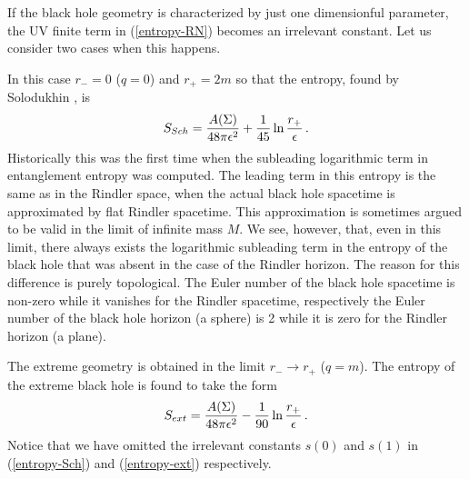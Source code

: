 \documentclass[12pt]{article}
\def\be{\begin{eqnarray}}
\def\ee{\end{eqnarray}}
\def\lb{\label}
\def\o{\over}
\begin{document}
\medskip
If the black hole geometry is characterized by just one dimensionful parameter, the UV finite term in (\ref{entropy-RN}) becomes an irrelevant constant.
Let us consider two cases when this happens.  
\medskip

 In this case $r_-=0$ ($q=0$) and $r_+=2m $ so that the entropy, found by Solodukhin  \cite{Solodukhin:1994yz}, is
\be
S_{Sch}={A(\Sigma)\o 48\pi\epsilon^2}+{1\o 45}\ln {r_+\o \epsilon}\, .
\lb{entropy-Sch}
\ee
Historically this was the first time when the subleading logarithmic term in entanglement  entropy was computed. The leading term in this entropy is the same as in the Rindler space, when the actual black hole spacetime is approximated by flat Rindler spacetime. This approximation is sometimes argued to be valid in the limit of infinite mass $M$. We see, however, that, even in this limit,  there always exists the logarithmic subleading term in the entropy of the black hole that was absent in the case of the Rindler horizon. The reason for this difference is purely topological. The Euler number of the black hole spacetime is non-zero while it vanishes for the Rindler spacetime, respectively the Euler number of the black hole horizon (a sphere) is 2 while it is zero for the Rindler horizon (a plane).

\medskip
{}  The extreme geometry is obtained in the limit $r_-\rightarrow r_+$ ($q=m$). The entropy of the extreme black hole is found to  take the form \cite{Solodukhin:1994st}
\be
S_{ext}={A(\Sigma)\o 48\pi\epsilon^2}-{1\o 90}\ln {r_+\o \epsilon}\, .
\lb{entropy-ext}
\ee
Notice that we have omitted the irrelevant constants  $s(0)$ and $s(1)$ in (\ref{entropy-Sch}) and (\ref{entropy-ext}) respectively.
\end{document}
